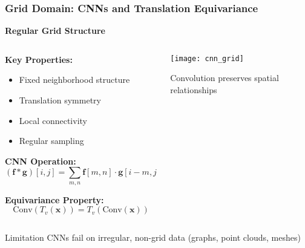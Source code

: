 \begin{frame}[fragile]\frametitle{Grid Domain: CNNs and Translation Equivariance}

\begin{center}
\textbf{Regular Grid Structure}
\end{center}

\begin{columns}
\begin{column}{0.6\textwidth}
\textbf{Key Properties:}
\begin{itemize}
\item Fixed neighborhood structure
\item Translation symmetry
\item Local connectivity
\item Regular sampling
\end{itemize}

\textbf{CNN Operation:}
$$(\mathbf{f} * \mathbf{g})[i,j] = \sum_{m,n} \mathbf{f}[m,n] \cdot \mathbf{g}[i-m, j-n]$$

\textbf{Equivariance Property:}
$$\text{Conv}(T_v(\mathbf{x})) = T_v(\text{Conv}(\mathbf{x}))$$
\end{column}
\begin{column}{0.4\textwidth}
\begin{center}
\texttt{[image: cnn\_grid]}

\vspace{0.5cm}
{\small Convolution preserves spatial relationships}
\end{center}
\end{column}
\end{columns}

\begin{alertblock}{Limitation}
CNNs fail on irregular, non-grid data (graphs, point clouds, meshes)
\end{alertblock}

\end{frame}

